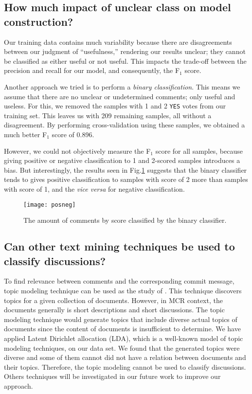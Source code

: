 \subsection{How much impact of unclear class on model construction?}
Our training data contains much variability because there are disagreements between our judgment of ``usefulness,'' rendering our results unclear; they cannot be classified as either useful or not useful.
This impacts the trade-off between the precision and recall for our model, and consequently, the F$_1$ score.

Another approach we tried is to perform a \emph{binary classification}.
This means we assume that there are no unclear or undetermined comments; only useful and useless.
For this, we removed the samples with 1 and 2 \texttt{YES} votes from our training set.
This leaves us with 209 remaining samples, all without a disagreement.
By performing cross-validation using these samples, we obtained a much better F$_1$ score of 0.896.

However, we could not objectively measure the F$_1$ score for all samples, because giving positive or negative classification to 1 and 2-scored samples introduces a bias.
But interestingly, the results seen in Fig.\ref{fig:binary} suggests that the binary classifier tends to gives positive classification to samples with score of 2 more than samples with score of 1, and the \emph{vice versa} for negative classification. 

\begin{figure}[h]
\centering
\texttt{[image: posneg]}
\caption{The amount of comments by score classified by the binary classifier.}
\label{fig:binary}
\end{figure}

\subsection{Can other text mining techniques be used to classify discussions?}
To find relevance between comments and the corresponding commit message, topic modeling technique can be used as the study of \cite{Barua2012a}. This technique discovers topics for a given collection of documents. However, in MCR context, the documents generally is short descriptions and short discussions. 
The topic modeling technique would generate topics that include diverse actual topics of documents since the content of documents is insufficient to determine. We have applied Latent Dirichlet allocation (LDA), which is a well-known model of topic modeling techniques, on our data set. We found that the generated topics were diverse and some of them cannot did not have a relation between documents and their topics. Therefore, the topic modeling cannot be used to classify discussions. Others techniques will be investigated in our future work to improve our approach.

